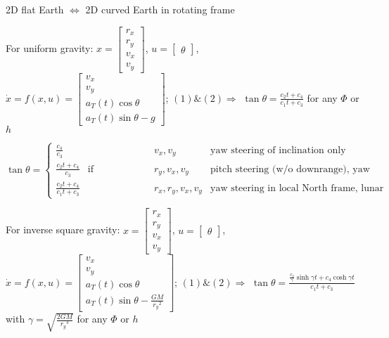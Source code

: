 \documentclass[11pt,landscape]{article}
\begin{document}
2D flat Earth $\Leftrightarrow$ 2D curved Earth in rotating frame

For uniform gravity:
$x = \begin{bmatrix} r_x \\ r_y \\ v_x \\ v_y \end{bmatrix}$,
$u = \begin{bmatrix} \theta \end{bmatrix}$,
$\dot{x} = f(x, u) = 
\begin{bmatrix} v_x \\ v_y \\ a_T(t)\cos\theta \\ a_T(t)\sin\theta - g
\end{bmatrix}$;
$(1) \& (2) \Rightarrow$
$\tan\theta = \frac{c_2 t + c_4}{c_1 t + c_3}$
for any $\Phi$ or $h$

$
\tan\theta = \left\{
\begin{matrix}
\frac{c_4}{c_3} & & v_x, v_y &
  \text{yaw steering of inclination only} \\
\frac{c_2 t + c_4}{c_3} & \text{if constraining} & r_y, v_x, v_y &
  \text{pitch steering (w/o downrange), yaw steering in insertion plane} \\
\frac{c_2 t + c_4}{c_1 t + c_3} & & r_x, r_y, v_x, v_y &
  \text{yaw steering in local North frame, lunar landing}
\end{matrix}
\right.
$

For inverse square gravity:
$x = \begin{bmatrix} r_x \\ r_y \\ v_x \\ v_y \end{bmatrix}$,
$u = \begin{bmatrix} \theta \end{bmatrix}$,
$\dot{x} = f(x, u) = 
\begin{bmatrix} v_x \\ v_y \\ a_T(t)\cos\theta \\ 
a_T(t)\sin\theta - \frac{GM}{{r_y}^2} \end{bmatrix}$;
$(1) \& (2) \Rightarrow$
$\tan\theta = \frac{\frac{c_2}{\gamma}\sinh{\gamma t}+c_4\cosh{\gamma t}}{c_1 t + c_3}$
with $\gamma = \sqrt{\frac{2GM}{{r_y}^3}}$ 
for any $\Phi$ or $h$



\newpage
\end{document}
